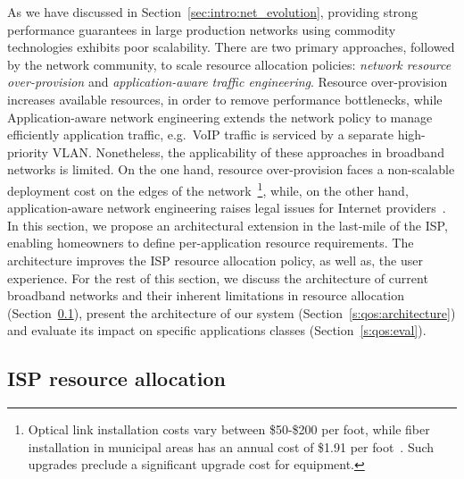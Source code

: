 As we have discussed in Section~\ref{sec:intro:net_evolution}, providing strong
performance guarantees in large production networks using commodity technologies
exhibits poor scalability. There are two primary approaches, followed by the network
community, to scale resource allocation policies: \emph{network resource
  over-provision} and \emph{application-aware traffic engineering}.  Resource
over-provision increases available resources, in order to remove performance
bottlenecks, while Application-aware network engineering extends the network
policy to  manage efficiently application traffic, e.g.~VoIP traffic is serviced
by a separate high-priority VLAN\@. Nonetheless, the applicability of these
approaches in broadband networks is limited. On the one hand, resource
over-provision faces a non-scalable deployment cost on the edges of the
network~\footnote{Optical link installation costs vary between \$50-\$200 per
  foot, while fiber installation in municipal areas has an annual cost of \$1.91
  per foot~. Such upgrades preclude a significant upgrade
  cost for equipment.}, while, on the other hand, application-aware network
engineering raises legal issues for Internet providers~. In this
section, we propose an architectural extension in the last-mile of the ISP,
enabling homeowners to define per-application resource requirements.  The
architecture improves the ISP resource allocation policy, as well as, the user
experience.  For the rest of this section, we discuss the architecture of
current broadband networks and their  inherent limitations in resource allocation
(Section~\ref{s:qos:motivation}), present the architecture of our
system (Section~\ref{s:qos:architecture}) and evaluate its impact on specific
applications classes (Section~\ref{s:qos:eval}).

\subsection{ISP resource allocation} \label{s:qos:motivation}

